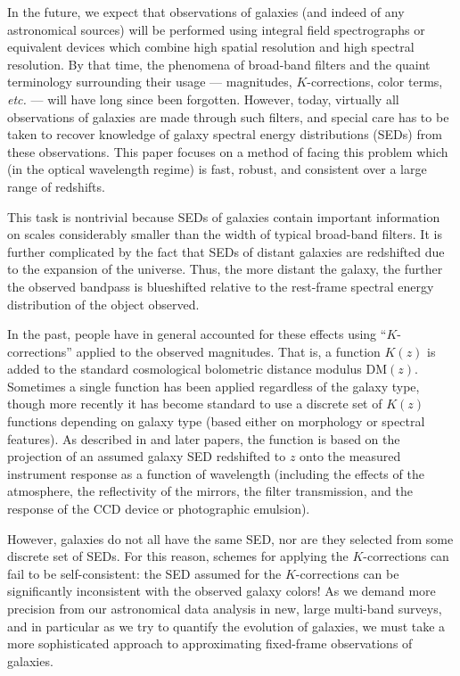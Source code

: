 \documentclass[10pt,preprint]{aastex}
\begin{document}
In the future, we expect that observations of galaxies (and indeed of
any astronomical sources) will be performed using integral field
spectrographs or equivalent devices which combine high spatial
resolution and high spectral resolution. By that time, the phenomena
of broad-band filters and the quaint terminology surrounding their
usage --- magnitudes, $K$-corrections, color terms, {\it etc.} ---
will have long since been forgotten. However, today, virtually all
observations of galaxies are made through such filters, and special
care has to be taken to recover knowledge of galaxy spectral energy
distributions (SEDs) from these observations. This paper focuses on a
method of facing this problem which (in the optical wavelength regime)
is fast, robust, and consistent over a large range of redshifts.

This task is nontrivial because SEDs of galaxies contain important
information on scales considerably smaller than the width of typical
broad-band filters. It is further complicated by the fact that SEDs of
distant galaxies are redshifted due to the expansion of the
universe. Thus, the more distant the galaxy, the further the observed
bandpass is blueshifted relative to the rest-frame spectral energy
distribution of the object observed.

In the past, people have in general accounted for these effects using
``$K$-corrections'' applied to the observed magnitudes. That is, a
function $K(z)$ is added to the standard cosmological bolometric
distance modulus $\mathrm{DM}(z)$. Sometimes a single function has
been applied regardless of the galaxy type, though more recently it
has become standard to use a discrete set of $K(z)$ functions
depending on galaxy type (based either on morphology or spectral
features). As described in \cite{oke68a} and later papers, the
function is based on the projection of an assumed galaxy SED
redshifted to $z$ onto the measured instrument response as a function
of wavelength (including the effects of the atmosphere, the
reflectivity of the mirrors, the filter transmission, and the response
of the CCD device or photographic emulsion).

However, galaxies do not all have the same SED, nor are they selected
from some discrete set of SEDs. For this reason, schemes for applying
the $K$-corrections can fail to be self-consistent: the SED assumed
for the $K$-corrections can be significantly inconsistent with the
observed galaxy colors! As we demand more precision from our
astronomical data analysis in new, large multi-band surveys, and in
particular as we try to quantify the evolution of galaxies, we must
take a more sophisticated approach to approximating fixed-frame
observations of galaxies.
\end{document}
